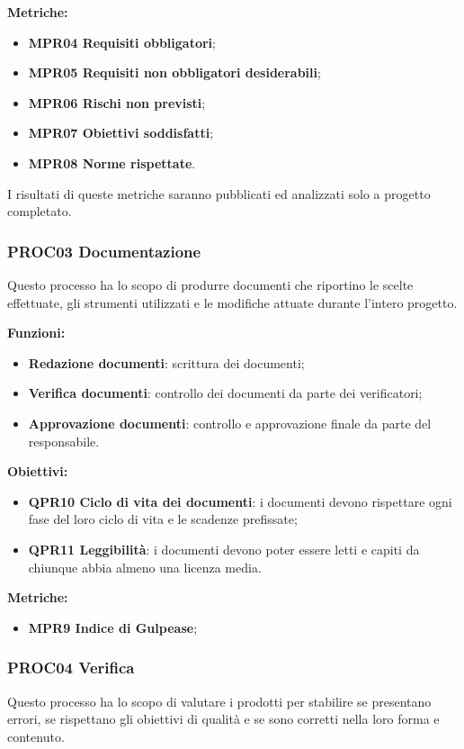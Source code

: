 \documentclass[../piano_di_qualifica.tex]{subfiles}
\begin{document}
\textbf{Metriche:}
\smallbreak
\begin{itemize}
	\item \textbf{MPR04 Requisiti obbligatori};
	\item \textbf{MPR05 Requisiti non obbligatori desiderabili};
	\item \textbf{MPR06 Rischi non previsti};
	\item \textbf{MPR07 Obiettivi soddisfatti};
	\item \textbf{MPR08 Norme rispettate}.
\end{itemize}

I risultati di queste metriche saranno pubblicati ed analizzati solo a progetto completato.

\subsubsection{PROC03 Documentazione}
Questo processo ha lo scopo di produrre documenti che riportino le scelte effettuate, gli strumenti utilizzati e le modifiche attuate durante l'intero progetto.

\textbf{Funzioni:}
\smallbreak
\begin{itemize}
	\item \textbf{Redazione documenti}: scrittura dei documenti;
	\item \textbf{Verifica documenti}: controllo dei documenti da parte dei verificatori;
	\item \textbf{Approvazione documenti}: controllo e approvazione finale da parte del responsabile.
\end{itemize}

\textbf{Obiettivi:}
\smallbreak
\begin{itemize}
	\item \textbf{QPR10 Ciclo di vita dei documenti}: i documenti devono rispettare ogni fase del loro ciclo di vita e le scadenze prefissate;
	\item \textbf{QPR11 Leggibilità}: i documenti devono poter essere letti e capiti da chiunque abbia almeno una licenza media.
\end{itemize}

\textbf{Metriche:}
\smallbreak
\begin{itemize}
	\item \textbf{MPR9 Indice di Gulpease};
\end{itemize}

\subsubsection{PROC04 Verifica}
Questo processo ha lo scopo di valutare i prodotti per stabilire se presentano errori, se rispettano gli obiettivi di qualità e se sono corretti nella loro forma e contenuto.
\end{document}

